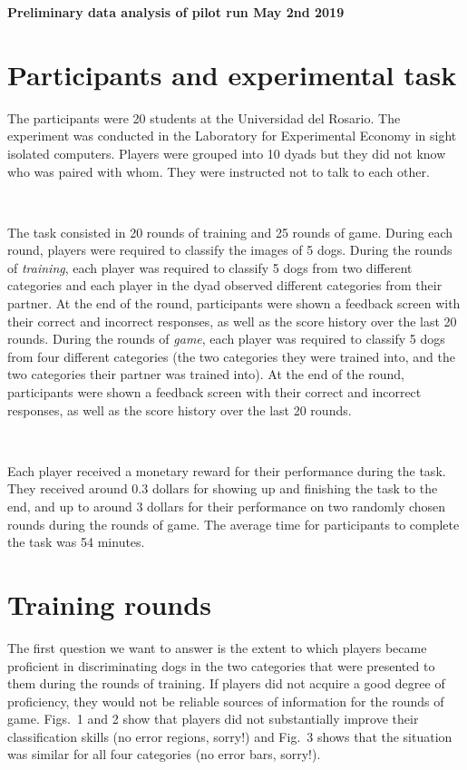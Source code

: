 \documentclass{article}
\begin{document}
 
 \centerline{\textbf{\Large Preliminary data analysis of pilot run May 2nd 2019}}
 
\section{Participants and experimental task} 
The participants were 20 students at the Universidad del Rosario. The experiment was conducted in the Laboratory for Experimental Economy in sight isolated computers. Players were grouped into 10 dyads but they did not know who was paired with whom. They were instructed not to talk to each other.  

\

The task consisted in 20 rounds of training and 25 rounds of game. During each round, players were required to classify the images of 5 dogs. During the rounds of \emph{training}, each player was required to classify 5 dogs from two different categories and each player in the dyad observed different categories from their partner. At the end of the round, participants were shown a feedback screen with their correct and incorrect responses, as well as the score history over the last 20 rounds. During the rounds of \emph{game}, each player was required to classify 5 dogs from four different categories (the two categories they were trained into, and the two categories their partner was trained into). At the end of the round, participants were shown a feedback screen with their correct and incorrect responses, as well as the score history over the last 20 rounds. 

\

Each player received a monetary reward for their performance during the task. They received around 0.3 dollars for showing up and finishing the task to the end, and up to around 3 dollars for their performance on two randomly chosen rounds during the rounds of game. The average time for participants to complete the task was 54 minutes.

\section{Training rounds}
The first question we want to answer is the extent to which players became proficient in discriminating dogs in the two categories that were presented to them during the rounds of training. If players did not acquire a good degree of proficiency, they would not be reliable sources of information for the rounds of game. Figs.~1 and 2 show that players did not substantially improve their classification skills (no error regions, sorry!) and Fig.~3 shows that the situation was similar for all four categories (no error bars, sorry!).
\end{document}
